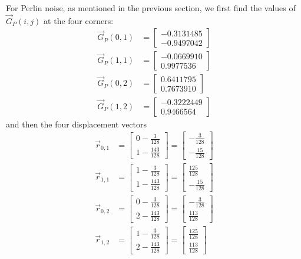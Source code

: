 For Perlin noise, as mentioned in the previous section, we first find the values of $\vec{G}_P(i,j)$ at the four corners:
\begin{align*}
\vec{G}_P(0,1)&=
\begin{bmatrix}
    -0.3131485\\
    -0.9497042    
\end{bmatrix}\\
\vec{G}_P(1,1)&=
\begin{bmatrix}
    -0.0669910\\
    0.9977536    
\end{bmatrix}\\
\vec{G}_P(0,2)&=
\begin{bmatrix}
    0.6411795\\
    0.7673910   
\end{bmatrix}\\
\vec{G}_P(1,2)&=
\begin{bmatrix}
    -0.3222449\\
    0.9466564
\end{bmatrix}
\end{align*}
and then the four displacement vectors
\begin{align*}
    \vec{r}_{0,1}&=
    \begin{bmatrix}
        0-\frac{3}{128} \\
        1-\frac{143}{128}
    \end{bmatrix}
    =
    \begin{bmatrix}
        -\frac{3}{128} \\
        -\frac{15}{128}
    \end{bmatrix}\\
    \vec{r}_{1,1}&=
    \begin{bmatrix}
        1-\frac{3}{128} \\
        1-\frac{143}{128}
    \end{bmatrix}
    =
    \begin{bmatrix}
        \frac{125}{128} \\
        -\frac{15}{128}
    \end{bmatrix}\\
    \vec{r}_{0,2}&=
    \begin{bmatrix}
        0-\frac{3}{128} \\
        2-\frac{143}{128}
    \end{bmatrix}
    =
    \begin{bmatrix}
        -\frac{3}{128} \\
        \frac{113}{128}
    \end{bmatrix}\\
    \vec{r}_{1,2}&=
    \begin{bmatrix}
        1-\frac{3}{128} \\
        2-\frac{143}{128}
    \end{bmatrix}
    =
    \begin{bmatrix}
        \frac{125}{128} \\
        \frac{113}{128}
    \end{bmatrix}
\end{align*}
